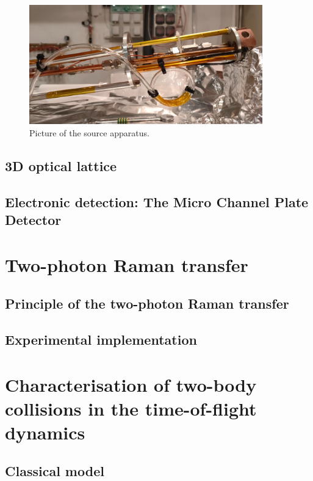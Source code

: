 \begin{figure}
    \centering
    \includegraphics[width=0.9\textwidth]{Fig/Chapter3/source.png}
    \caption{Picture of the source apparatus.}
    \label{fig:my_label}
\end{figure}

\subsection{3D optical lattice}

\subsection{Electronic detection: The Micro Channel Plate Detector}

\section{Two-photon Raman transfer}

\subsection{Principle of the two-photon Raman transfer}

\subsection{Experimental implementation}

\section{Characterisation of two-body collisions in the time-of-flight dynamics}

\subsection{Classical model}

